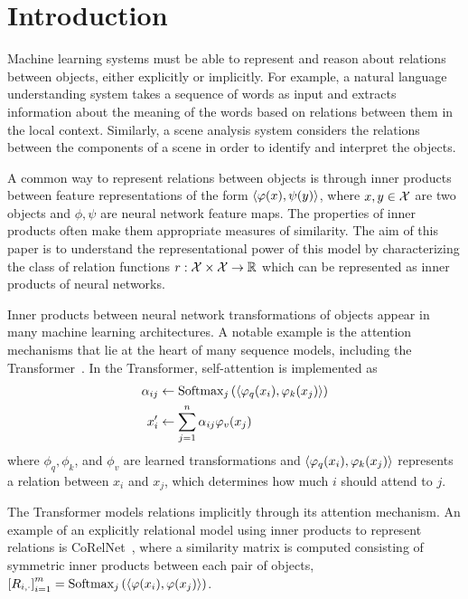 \section{Introduction}\label{sec:intro}

Machine learning systems must be able to represent and reason about relations between objects, either explicitly or implicitly. For example, a natural language understanding system takes a sequence of words as input and extracts information about the meaning of the words based on relations between them in the local context. Similarly, a scene analysis system considers the relations between the components of a scene in order to identify and interpret the objects. 

A common way to represent relations between objects is through inner products between feature representations of the form $\left \langle \varphi(x), \psi(y) \right\rangle$, where $x, y \in {\mathcal{X}}$ are two objects and $\phi, \psi$ are neural network feature maps. The properties of inner products often make them appropriate measures of similarity. The aim of this paper is to understand the representational power of this model by characterizing the class of relation functions $r: {\mathcal{X}} \times {\mathcal{X}} \to \mathbb{R}$ which can be represented as inner products of neural networks.

Inner products between neural network transformations of objects appear in many machine learning architectures. A notable example is the attention mechanisms that lie at the heart of many sequence models, including the Transformer~\parencite{vaswani2017attention}. In the Transformer, self-attention is implemented as
\begin{equation*}
    \begin{split}
        \alpha_{ij} &\gets \mathrm{Softmax}_j\paren{{\iprod{\phi_q(x_i)}{\phi_k(x_j)}}}\\
        x_i' &\gets \sum_{j=1}^{n} \alpha_{ij} \phi_v(x_j)
    \end{split}
\end{equation*}
where $\phi_q, \phi_k$, and $\phi_v$ are learned transformations and $\left \langle \varphi_q(x_i), \varphi_k(x_j) \right\rangle$ represents a relation between $x_i$ and $x_j$, which determines how much $i$ should attend to $j$.

The Transformer models relations implicitly through its attention mechanism. An example of an explicitly relational model using inner products to represent relations is CoRelNet~\parencite{Kerg2022OnNA}, where a similarity matrix is computed consisting of symmetric inner products between each pair of objects, $\left[R_{i,\cdot}\right]_{i=1}^m = \mathrm{Softmax}_j\left({\left \langle \varphi(x_i), \varphi(x_j) \right\rangle}\right)$.

